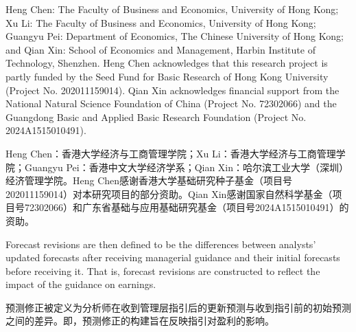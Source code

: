 \documentclass[12pt,a4paper]{article}
\newenvironment{original}
  {\par\medskip\noindent\ignorespaces}
  {\par\medskip}
\newenvironment{translation}
  {\par\noindent{\color{transblue}\ignorespaces}}
  {\par\bigskip}
\begin{document}
\begin{original}
Heng Chen: The Faculty of Business and Economics, University of Hong Kong; Xu Li: The Faculty of Business and Economics, University of Hong Kong; Guangyu Pei: Department of Economics, The Chinese University of Hong Kong; and Qian Xin: School of Economics and Management, Harbin Institute of Technology, Shenzhen. Heng Chen acknowledges that this research project is partly funded by the Seed Fund for Basic Research of Hong Kong University (Project No. 202011159014). Qian Xin acknowledges financial support from the National Natural Science Foundation of China (Project No. 72302066) and the Guangdong Basic and Applied Basic Research Foundation (Project No. 2024A1515010491).
\end{original}
\begin{translation}
Heng Chen：香港大学经济与工商管理学院；Xu Li：香港大学经济与工商管理学院；Guangyu Pei：香港中文大学经济学系；Qian Xin：哈尔滨工业大学（深圳）经济管理学院。Heng Chen感谢香港大学基础研究种子基金（项目号202011159014）对本研究项目的部分资助。Qian Xin感谢国家自然科学基金（项目号72302066）和广东省基础与应用基础研究基金（项目号2024A1515010491）的资助。
\end{translation}

\begin{original}
Forecast revisions are then defined to be the differences between analysts' updated forecasts after receiving managerial guidance and their initial forecasts before receiving it. That is, forecast revisions are constructed to reflect the impact of the guidance on earnings.
\end{original}
\begin{translation}
预测修正被定义为分析师在收到管理层指引后的更新预测与收到指引前的初始预测之间的差异。即，预测修正的构建旨在反映指引对盈利的影响。
\end{translation}
\end{document}
